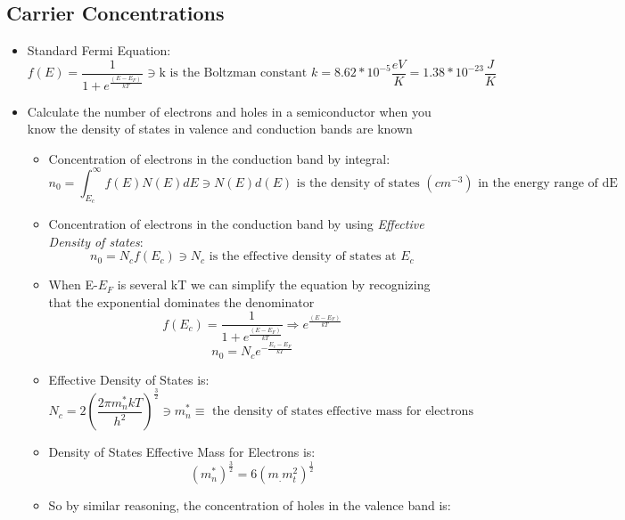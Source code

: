 \documentclass{article}
\begin{document}
\subsection{Carrier Concentrations}
\begin{itemize}
\item Standard Fermi Equation:
  \begin{equation}f(E)=\frac{1}{1+e^{\frac{(E-E_F)}{kT}}}\ni\text{k~is~the~Boltzman~constant~} k=8.62*10^{-5}\frac{eV}{K}=1.38*10^{-23}\frac{J}{K}\end{equation}
\item Calculate the number of electrons and holes in a semiconductor when you know the density of states in valence and conduction bands are known
  \begin{itemize}
  \item Concentration of electrons in the conduction band by integral:
    \begin{equation}n_0=\int_{E_c}^{\infty}f(E)N(E)dE\ni N(E)d(E)\text{~is~the~density~of~states~}(cm^{-3})\text{~in~the~energy~range~of~dE}\end{equation}
  \item Concentration of electrons in the conduction band by using \textit{Effective Density of states}:
    \begin{equation} n_0 = N_c f (E_c) \ni N_c \text{~is~the~effective~density~of~states~at~} E_c \end{equation}
  \item When E-$E_F$ is several kT we can simplify the equation by recognizing that the exponential dominates the denominator
    \begin{equation}f(E_c)=\frac{1}{1+e^{\frac{(E-E_F)}{kT}}}\Rightarrow e^{\frac{(E-E_F)}{kT}}\end{equation}
    \begin{equation}n_0=N_ce^{-\frac{E_c-E_F}{kT}}\end{equation}
  \item Effective Density of States is:
    \begin{equation}N_c=2(\frac{2\pi m_n^*kT}{h^2})^{\frac{3}{2}}\ni m_n^*\equiv \text{~the~density~of~states~effective~mass~for~electrons}\end{equation}
  \item Density of States Effective Mass for Electrons is:
    \begin{equation}(m_n^*)^{\frac{3}{2}}=6(m_.m_t^2)^{\frac{1}{2}}\end{equation}
  \item So by similar reasoning, the concentration of holes in the valence band is$:$

\end{itemize}
\end{itemize}
\end{document}
